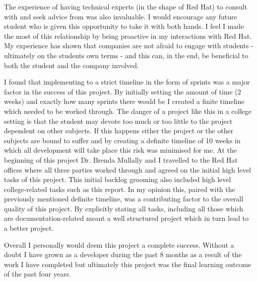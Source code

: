 The experience of having technical experts (in the shape of Red Hat) to consult with and seek advice from was also invaluable. I would encourage any future student who is given this opportunity to take it with both hands. I feel I made the most of this relationship by being proactive in my interactions with Red Hat. My experience has shown that companies are not afraid to engage with students - ultimately on the students own terms - and this can, in the end, be beneficial to both the student and the company involved.

I found that implementing to a strict timeline in the form of sprints was a major factor in the success of this project. By initially setting the amount of time (2 weeks) and exactly how many sprints there would be I created a finite timeline which needed to be worked through. The danger of a project like this in a college setting is that the student may devote too much or too little to the project dependent on other subjects. If this happens either the project or the other subjects are bound to suffer and by creating a definite timeline of 10 weeks in which all development will take place this risk was minimised for me. At the beginning of this project Dr. Brenda Mullally and I travelled to the Red Hat offices where all three parties worked through and agreed on the initial high level tasks of this project. This initial backlog grooming also included high level college-related tasks such as this report. In my opinion this, paired with the previously mentioned definite timeline, was a contributing factor to the overall quality of this project. By explicitly stating all tasks, including all those which are documentation-related meant a well structured project which in turn lead to a better project.

Overall I personally would deem this project a complete success. Without a doubt I have grown as a developer during the past 8 months as a result of the work I have completed but ultimately this project was the final learning outcome of the past four years.
